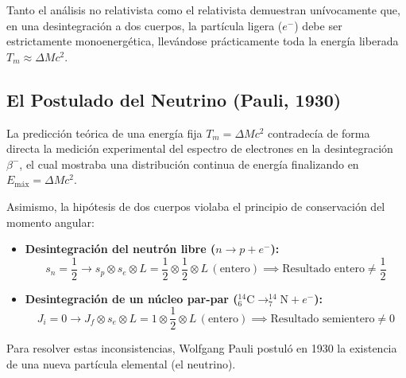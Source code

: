 \begin{concepto}
Tanto el análisis no relativista como el relativista demuestran unívocamente que, en una desintegración a dos cuerpos, la partícula ligera ($e^-$) debe ser estrictamente monoenergética, llevándose prácticamente toda la energía liberada $T_m \approx \Delta M c^2$.
\end{concepto}

\newpage
\subsection{El Postulado del Neutrino (Pauli, 1930)}

La predicción teórica de una energía fija $T_m = \Delta M c^2$ contradecía de forma directa la medición experimental del espectro de electrones en la desintegración $\beta^-$, el cual mostraba una distribución continua de energía finalizando en $E_{\text{máx}} = \Delta M c^2$.

Asimismo, la hipótesis de dos cuerpos violaba el principio de conservación del momento angular:
\begin{itemize}
    \item \textbf{Desintegración del neutrón libre ($n \to p + e^-$):}
    \begin{equation}
    s_n = \frac{1}{2} \longrightarrow s_p \otimes s_e \otimes L = \frac{1}{2} \otimes \frac{1}{2} \otimes L \,(\text{entero}) \implies \text{Resultado entero} \ne \frac{1}{2}
    \end{equation}
    \item \textbf{Desintegración de un núcleo par-par ($^{14}_6\text{C} \to ^{14}_7\text{N} + e^-$):}
    \begin{equation}
    J_i = 0 \longrightarrow J_f \otimes s_e \otimes L = 1 \otimes \frac{1}{2} \otimes L \,(\text{entero}) \implies \text{Resultado semientero} \ne 0
    \end{equation}
\end{itemize}

Para resolver estas inconsistencias, Wolfgang Pauli postuló en 1930 la existencia de una nueva partícula elemental (el neutrino).

